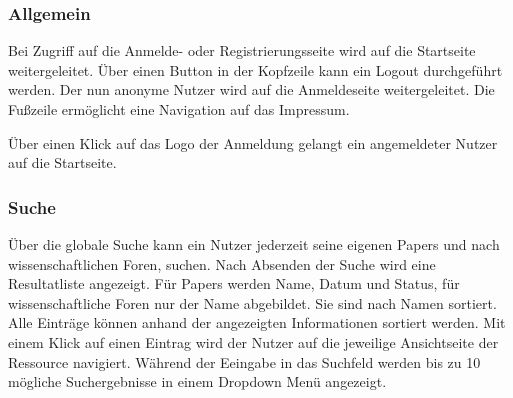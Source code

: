 \subsubsection{Allgemein}
\begin{description}
     Bei Zugriff auf die Anmelde- oder Registrierungsseite
    wird auf die Startseite weitergeleitet.
     Über einen Button in der Kopfzeile kann ein Logout durchgeführt werden.
    Der nun anonyme Nutzer wird auf die Anmeldeseite weitergeleitet.
     Die Fußzeile ermöglicht eine Navigation auf das Impressum.

     Über einen Klick auf das Logo der Anmeldung gelangt ein angemeldeter Nutzer auf die
    Startseite.
\end{description}

\subsubsection{Suche}
\begin{description}
     Über die globale Suche kann ein Nutzer jederzeit seine eigenen Papers und nach wissenschaftlichen Foren,
    suchen. Nach Absenden der Suche wird eine Resultatliste angezeigt. Für Papers werden Name, Datum und Status, für
    wissenschaftliche Foren nur der Name abgebildet. %
    Sie sind nach Namen sortiert.
     Alle Einträge können anhand der angezeigten Informationen sortiert werden.
    Mit einem Klick auf einen Eintrag wird der Nutzer auf die jeweilige Ansichtseite
    der Ressource navigiert.
     Während der Eeingabe in das Suchfeld werden bis zu 10 mögliche Suchergebnisse in
    einem Dropdown Menü angezeigt.
\end{description}

